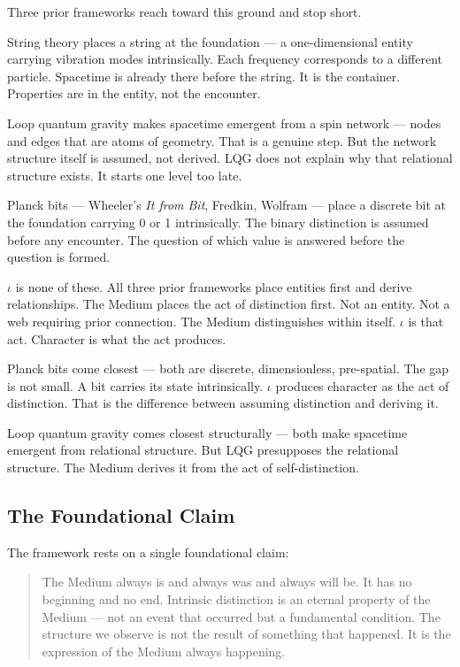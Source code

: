 \documentclass[11pt,letterpaper]{article}
\begin{document}
Three prior frameworks reach toward this ground and stop short.

String theory places a string at the foundation --- a one-dimensional entity carrying vibration modes intrinsically. Each frequency corresponds to a different particle. Spacetime is already there before the string. It is the container. Properties are in the entity, not the encounter.

Loop quantum gravity makes spacetime emergent from a spin network --- nodes and edges that are atoms of geometry. That is a genuine step. But the network structure itself is assumed, not derived. LQG does not explain why that relational structure exists. It starts one level too late.

Planck bits --- Wheeler's \emph{It from Bit}, Fredkin, Wolfram --- place a discrete bit at the foundation carrying 0 or 1 intrinsically. The binary distinction is assumed before any encounter. The question of which value is answered before the question is formed.

\(\iota\) is none of these. All three prior frameworks place entities first and derive relationships. The Medium places the act of distinction first. Not an entity. Not a web requiring prior connection. The Medium distinguishes within itself. \(\iota\) is that act. Character is what the act produces.

Planck bits come closest --- both are discrete, dimensionless, pre-spatial. The gap is not small. A bit carries its state intrinsically. \(\iota\) produces character as the act of distinction. That is the difference between assuming distinction and deriving it.

Loop quantum gravity comes closest structurally --- both make spacetime emergent from relational structure. But LQG presupposes the relational structure. The Medium derives it from the act of self-distinction.

\subsection{The Foundational Claim}
\label{sec:org02a2c54}

The framework rests on a single foundational claim:

\begin{quote}
The Medium always is and always was and always will be. It has no beginning and no end. Intrinsic distinction is an eternal property of the Medium --- not an event that occurred but a fundamental condition. The structure we observe is not the result of something that happened. It is the expression of the Medium always happening.
\end{quote}
\end{document}
